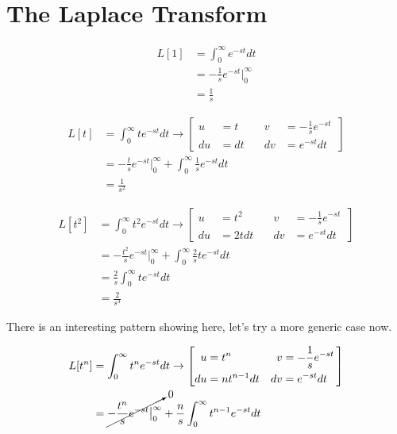 \section{The Laplace Transform}

\begin{align*}
L[1] &= \int_{0}^{\infty} e^{-st} dt \\
&= -\frac{1}{s} e^{-st} \big|_{0}^{\infty} \\
&= \frac{1}{s}
\end{align*}



\begin{align*}
L[t] &= \int_{0}^{\infty} t e^{-st} dt \rightarrow
\left[
    \begin{alignedat}{2}
    u  &= t     \quad & v  &= -\frac{1}{s} e^{-st} \\
    du &= dt    \quad & dv &= e^{-st} dt 
    \end{alignedat}\,
\right] \\
&= -\frac{t}{s} e^{-st} \big|_{0}^{\infty} + \int_{0}^{\infty} \frac{1}{s} e^{-st} dt \\
&= \frac{1}{s^2}
\end{align*}


\begin{align*}
L[t^2] &= \int_{0}^{\infty} t^2 e^{-st} dt \rightarrow
\left[
    \begin{alignedat}{2}
    u  &= t^2      \quad & v  &= -\frac{1}{s} e^{-st} \\
    du &= 2t dt    \quad & dv &= e^{-st} dt 
    \end{alignedat}\,
\right] \\
&= -\frac{t^2}{s} e^{-st} \big|_{0}^{\infty} + \int_{0}^{\infty} \frac{2}{s} t e^{-st} dt \\
&= \frac{2}{s} \int_{0}^{\infty} t e^{-st} dt \\
&= \frac{2}{s^3}
\end{align*}

There is an interesting pattern showing here, let's try a more generic case now.

\begin{align*}
L[t^n] &= \int_{0}^{\infty} t^n e^{-st} dt \rightarrow
\left[
    \begin{alignedat}{2}
    u  &= t^n             \quad & v  &= -\frac{1}{s} e^{-st} \\
    du &= n t^{n-1} dt    \quad & dv &= e^{-st} dt 
    \end{alignedat}\,
\right] \\
&= \cancelto{0}{ -\frac{t^n}{s} e^{-st} \big|_{0}^{\infty} } + \frac{n}{s} \int_{0}^{\infty} t^{n-1} e^{-st} dt
\end{align*}

